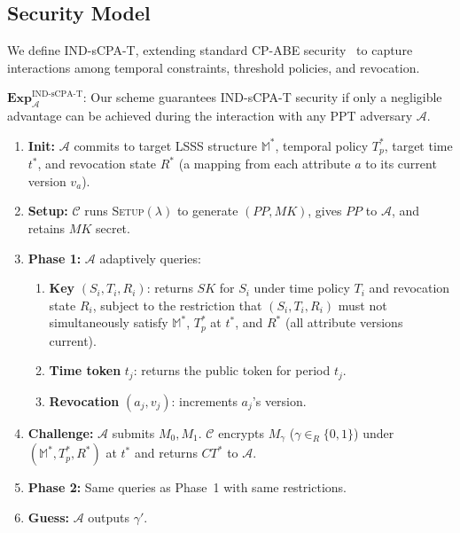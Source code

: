﻿\documentclass[lettersize,journal]{IEEEtran}
\begin{document}
\subsection{Security Model}
\label{subsec:sec_model}

We define IND-sCPA-T, extending standard CP-ABE
security~\cite{Li2022_CPABE_Survey, Iqal2024} to capture interactions among
temporal constraints, threshold policies, and revocation.

$\textbf{Exp}_{\mathcal{A}}^{\text{IND-sCPA-T}}$: Our scheme guarantees
IND-sCPA-T security if only a negligible advantage can be achieved during
the interaction with any PPT adversary $\mathcal{A}$.

\begin{enumerate}
    \item \textbf{Init:} $\mathcal{A}$ commits to target LSSS structure
    $\mathbb{M}^*$, temporal policy $T_p^*$, target time $t^*$, and
    revocation state $R^*$ (a mapping from each attribute $a$ to its
    current version $v_a$).
    \item \textbf{Setup:} $\mathcal{C}$ runs \textsc{Setup}$(\lambda)$ to
    generate $(PP, MK)$, gives $PP$ to $\mathcal{A}$, and retains $MK$
    secret.
    \item \textbf{Phase 1:} $\mathcal{A}$ adaptively queries:
    \begin{enumerate}
        \item \textbf{Key} $(S_i, T_i, R_i)$: returns $SK$ for $S_i$ under
        time policy $T_i$ and revocation state $R_i$, subject to the
        restriction that $(S_i, T_i, R_i)$ must not simultaneously satisfy
        $\mathbb{M}^*$, $T_p^*$ at $t^*$, and $R^*$ (all attribute
        versions current).
        \item \textbf{Time token} $t_j$: returns the public token for period
        $t_j$.
        \item \textbf{Revocation} $(a_j, v_j)$: increments $a_j$'s version.
    \end{enumerate}
    \item \textbf{Challenge:} $\mathcal{A}$ submits $M_0, M_1$. $\mathcal{C}$
    encrypts $M_\gamma$ ($\gamma \in_R \{0,1\}$) under $(\mathbb{M}^*,
    T_p^*, R^*)$ at $t^*$ and returns $CT^*$ to $\mathcal{A}$.
    \item \textbf{Phase 2:} Same queries as Phase~1 with same restrictions.
    \item \textbf{Guess:} $\mathcal{A}$ outputs $\gamma'$.
\end{enumerate}
\end{document}
